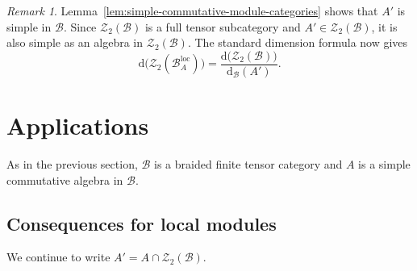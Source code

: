 \documentclass[11pt,reqno]{amsart}
\numberwithin{equation}{section}
\theoremstyle{plain}
\theoremstyle{definition}
\theoremstyle{remark}
\newtheorem{remark}[thmctr]{Remark}
\newcommand{\B}{\mathcal{B}}
\newcommand{\Z}{\mathcal{Z}}
\newcommand{\loc}{\mathrm{loc}}
\newcommand{\FP}{\mathrm{d}}
\begin{document}
\begin{remark}
Lemma~\ref{lem:simple-commutative-module-categories} shows that $A'$ is simple
in $\B$. Since $\Z_2(\B)$ is a full tensor subcategory and
$A'\in\Z_2(\B)$, it is also simple as an algebra in $\Z_2(\B)$. The standard
dimension formula \cite[Lemma~5.15]{shimizu2026commutative} now gives
\begin{equation}\label{eq:muger-center-local-module-fpdim}
  \FP\bigl(\Z_2(\B_A^{\loc})\bigr)
  =
  \frac{\FP\bigl(\Z_2(\B)\bigr)}{\FP_{\B}(A')}.
\end{equation}
\end{remark}




\section{Applications}
\label{sec:applications}
As in the previous section, $\B$ is a braided finite tensor category and $A$ is a simple commutative algebra in $\B$.


\subsection{Consequences for local modules}\label{sec:consequences}
We continue to write $A'=A\cap\Z_2(\B)$.
\end{document}
